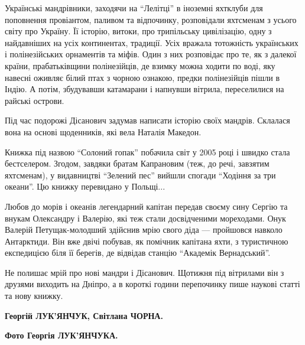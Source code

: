 Українські мандрівники, заходячи на \enquote{Лелітці} в іноземні яхтклуби для
поповнення провіантом, паливом та відпочинку, розповідали яхтсменам з усього
світу про Україну. Її історію, витоки, про трипільську цивілізацію, одну з
найдавніших на усіх континентах, традиції. Усіх вражала тотожність українських
і полінезійських орнаментів та міфів. Один з них розповідає про те, як з
далекої країни, прабатьківщини полінезійців, де взимку можна ходити по воді,
яку навесні оживляє білий птах з чорною ознакою, предки полінезійців пішли в
Індію. А потім, збудувавши катамарани і напнувши вітрила, переселилися на
райські острови.

Під час подорожі Дісанович задумав написати історію своїх мандрів. Склалася
вона на основі щоденників, які вела Наталія Македон.

Книжка під назвою \enquote{Солоний гопак} побачила світ у 2005 році і швидко стала
бестселером. Згодом, завдяки братам Капрановим (теж, до речі, завзятим
яхтсменам), у видавництві \enquote{Зелений пес} вийшли спогади \enquote{Ходіння за три океани}.
Цю книжку перевидано у Польщі...

Любов до морів і океанів легендарний капітан передав своєму сину Сергію та
внукам Олександру і Валерію, які теж стали досвідченими мореходами. Онук
Валерій Петущак-молодший здійснив мрію свого діда — пройшовся навколо
Антарктиди. Він вже двічі побував, як помічник капітана яхти, з туристичною
експедицією біля її берегів, де відвідав станцію \enquote{Академік Вернадський}.

Не полишає мрій про нові мандри і Дісанович. Щотижня під вітрилами він з
друзями виходить на Дніпро, а в короткі години перепочинку пише наукові статті
та нову книжку.

\textbf{Георгій ЛУК'ЯНЧУК, Світлана ЧОРНА.}

\textbf{Фото Георгія ЛУК'ЯНЧУКА.}
